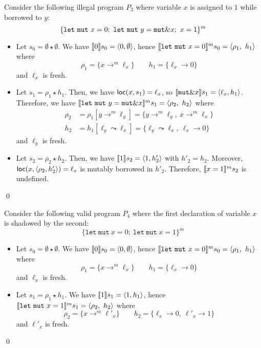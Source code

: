 \begin{example}
  Consider the following illegal program $P_3$
  where variable $x$ is assigned to $1$ while
  borrowed to $y$:
  \[
    \{
      \mathtt{let\ mut}\ x = 0;\
      \mathtt{let\ mut}\ y = \mathtt{mut}\borrow x;\
      x = 1
    \}^m
  \]
  \begin{itemize}
    \item Let $s_0=\emptyset \star \emptyset$.
    We have $\den[0]{s_0} = \langle 0,\emptyset\rangle$, hence
    $\denl[\mathtt{let\ mut}\ x = 0]{m}{s_0} =
    \langle \rho_1,\ h_1\rangle$ where
    \[\rho_1=\{x\to^m\ell_x\} \qquad
    h_1 = \{\ell_x\to 0\}\]
    and $\ell_x$ is fresh.
    \item Let $s_1 = \rho_1 \star h_1$.
    Then, we have $\loc(x,s_1) = \ell_x$, so
    $\den[\mathtt{mut}\borrow x]{s_1} = \langle \ell_x,h_1\rangle$.
    Therefore, we have
    $\denl[\mathtt{let\ mut}\ y = \mathtt{mut}\borrow x]{m}{s_1} =
    \langle \rho_2,\ h_2\rangle$
    where
    \begin{align*}
      \rho_2 & = \rho_1[y\to^m\ell_y] = \{y\to^m\ell_y,\ x\to^m\ell_x\}\\
      h_2 & = h_1[\ell_y\leadsto \ell_x] =
      \{\ell_y\leadsto \ell_x,\ \ell_x\to 0\}
    \end{align*}
    and $\ell_y$ is fresh.
    \item Let $s_2 = \rho_2 \star h_2$.
    Then, we have $\den[1]{s_2} = \langle 1,h'_2\rangle$ with $h'_2=h_2$.
    Moreover, $\loc(x,\langle\rho_2,h'_2\rangle) = \ell_x$ is
    mutably borrowed in $h'_2$.
    Therefore, $\denl[x = 1]{m}{s_2}$ is undefined.
  \end{itemize}
  \qed
\end{example}

\begin{example}
  Consider the following valid program $P_4$
  where the first declaration of variable $x$ is
  shadowed by the second:
  \[
    \{
      \mathtt{let\ mut}\ x = 0;\
      \mathtt{let\ mut}\ x = 1
    \}^m
  \]
  \begin{itemize}
    \item Let $s_0=\emptyset \star \emptyset$.
    We have $\den[0]{s_0} = \langle 0,\emptyset\rangle$, hence
    $\denl[\mathtt{let\ mut}\ x = 0]{m}{s_0} =
    \langle \rho_1,\ h_1\rangle$ where
    \[\rho_1=\{x\to^m\ell_x\} \qquad
    h_1 = \{\ell_x\to 0\}\]
    and $\ell_x$ is fresh.
    \item Let $s_1 = \rho_1 \star h_1$.
    We have $\den[1]{s_1} = \langle 1,h_1\rangle$, hence
    $\denl[\mathtt{let\ mut}\ x = 1]{m}{s_1} =
    \langle \rho_2,\ h_2\rangle$ where
    \[\rho_2=\{x\to^m\ell'_x\} \qquad
    h_2 = \{\ell_x\to 0,\ \ell'_x\to 1\}\]
    and $\ell'_x$ is fresh.
  \end{itemize}
  \qed
\end{example}

